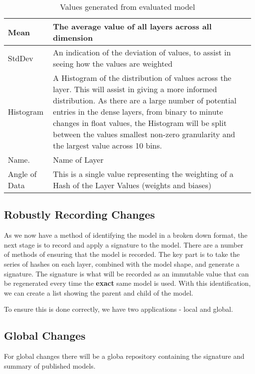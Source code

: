 \begin{table}[h]
    \caption{Values generated from evaluated model}
    \setlength\tabcolsep{0pt} %
    \begin{tabular}{@{} |p{2cm}|p{6.5cm}| @{}}
        Mean    & The average value of all layers across all dimension \\ \hline 
        StdDev  & An indication of the deviation of values, to assist in seeing how the values are weighted \\ \hline
        Histogram & A Histogram of the distribution of values across the layer. This will assist in giving a more informed distribution. As there are a large number of potential entries in the dense layers, from binary to minute changes in float values, the Histogram will be split between the values smallest non-zero granularity and the largest value across 10 bins. \\ \hline
        Name.   & Name of Layer \\ \hline
        Angle of Data & This is a single value representing the weighting of a Hash of the Layer Values (weights and biases) \\ 
    \end{tabular}
\end{table}

\subsection{Robustly Recording Changes}
As we now have a method of identifying the model in a broken down format, the next stage is to record and apply a signature to the model. There are a number of methods of ensuring that the model is recorded. The key part is to take the series of hashes on each layer, combined with the model shape, and generate a signature. The signature is what will be recorded as an immutable value that can be regenerated every time the \textbf{exact} same model is used. With this identification, we can create a list showing the parent and child of the model.

To ensure this is done correctly, we have two applications - local and global.
\subsection{Global Changes}
For global changes there will be a globa repository containing the signature and summary of published models. 

